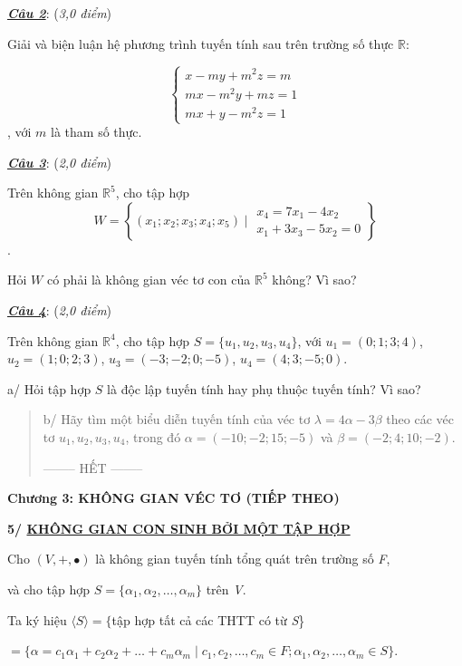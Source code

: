 \documentclass[12pt,a4paper]{article}
\newcommand{\ul}[1]{\uline{#1}}
\begin{document}
\emph{\textbf{\ul{Câu 2}}}: (\emph{3,0 điểm})

Giải và biện luận hệ phương trình tuyến tính sau trên trường số thực
$\mathbb{R}$:

\[\begin{cases} x - my + m^2 z = m \\ mx - m^2 y + mz = 1 \\ mx + y - m^2 z = 1 \end{cases}\], với
$m$ là tham số thực.

\emph{\textbf{\ul{Câu 3}}}: (\emph{2,0 điểm})

Trên không gian $\mathbb{R}^5$, cho
tập hợp \[W = \left\{ (x_1; x_2; x_3; x_4; x_5) \mid \begin{matrix} x_4 = 7x_1 - 4x_2 \\ x_1 + 3x_3 - 5x_2 = 0 \end{matrix} \right\}\].

Hỏi $W$ có phải là không
gian véc tơ con của $\mathbb{R}^5$
không? Vì sao?

\emph{\textbf{\ul{Câu 4}}}: (\emph{2,0 điểm})

Trên không gian $\mathbb{R}^4$, cho
tập hợp $S = \{u_1, u_2, u_3, u_4\}$, với
$u_1 = (0; 1; 3; 4)$,
$u_2 = (1; 0; 2; 3)$,
$u_3 = (-3; -2; 0; -5)$,
$u_4 = (4; 3; -5; 0)$.

a/ Hỏi tập hợp $S$ là độc
lập tuyến tính hay phụ thuộc tuyến tính? Vì sao?

\begin{quote}
b/ Hãy tìm một biểu diễn tuyến tính của véc tơ
$\lambda = 4\alpha - 3\beta$ theo các véc tơ
$u_1, u_2, u_3, u_4$, trong đó
$\alpha = (-10; -2; 15; -5)$ và
$\beta = (-2; 4; 10; -2)$.

-------- HẾT --------
\end{quote}

\textbf{Chương 3: KHÔNG GIAN VÉC TƠ (TIẾP THEO)}

\textbf{5/ \ul{KHÔNG GIAN CON SINH BỞI MỘT TẬP HỢP}}

Cho $(V, +, \bullet)$ là không gian
tuyến tính tổng quát trên trường số \emph{F},

và cho tập hợp $S = \{\alpha_1, \alpha_2, \dots, \alpha_m\}$ trên
\emph{V}.

Ta ký hiệu $\langle S \rangle = \{$tập hợp tất
cả các THTT có từ \emph{S}\}

$= \{ \alpha = c_1 \alpha_1 + c_2 \alpha_2 + \dots + c_m \alpha_m \mid c_1, c_2, \dots, c_m \in F; \alpha_1, \alpha_2, \dots, \alpha_m \in S \}$.
\end{document}
